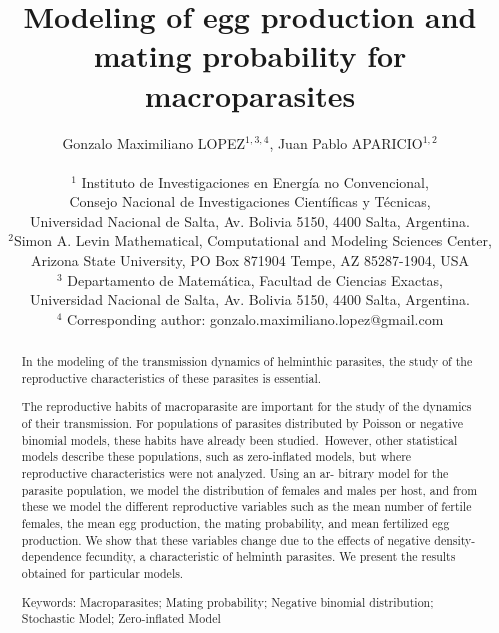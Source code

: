 \documentclass[12pt,a4paper]{article}
\title{Modeling of egg production and mating probability for macroparasites}
\author{Gonzalo Maximiliano LOPEZ$^{1,3,4}$, Juan Pablo APARICIO$^{1,2}$\\
	\\
	{\small $^1$ Instituto de Investigaciones en Energ\'ia no Convencional,} \\ {\small Consejo Nacional de Investigaciones Cient\'ificas y T\'ecnicas,}\\
	{\small Universidad Nacional de Salta, Av. Bolivia 5150, 4400 Salta, Argentina.}\\
	$^2${\small Simon A. Levin Mathematical, Computational and Modeling Sciences Center,} \\ {\small Arizona State University, PO Box 871904 Tempe, AZ 85287-1904, USA}\\
	{\small $^3$ Departamento de Matem\'atica, Facultad de Ciencias Exactas,}\\{\small Universidad Nacional de Salta, Av. Bolivia 5150, 4400 Salta, Argentina.}\\
	{\small $^4$ Corresponding author: gonzalo.maximiliano.lopez@gmail.com}}
\date{}
\theoremstyle{plain}%
\theoremstyle{definition}
\theoremstyle{remark}
\begin{document}
\maketitle

\begin{abstract}

In the modeling of the transmission dynamics of helminthic parasites, the study of the reproductive characteristics of these parasites is essential.

The reproductive habits of macroparasite are important for the study of the dynamics of their transmission. For populations of parasites distributed by Poisson or negative binomial models, these habits have already been studied. However, other statistical models describe these populations, such as zero-inflated models, but where reproductive characteristics were not analyzed. Using an ar- bitrary model for the parasite population, we model the distribution of females and males per host, and from these we model the different reproductive variables such as the mean number of fertile females, the mean egg production, the mating probability, and mean fertilized egg production. We show that these variables change due to the effects of negative density-dependence fecundity, a characteristic of helminth parasites. We present the results obtained for particular models.

	
	Keywords: Macroparasites; Mating probability; Negative binomial distribution; Stochastic Model; Zero-inflated Model
\end{abstract}
\end{document}

